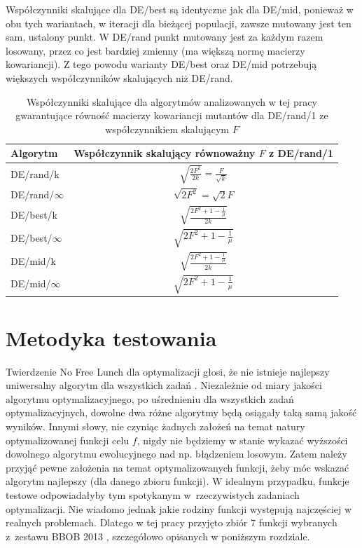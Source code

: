 \documentclass[a4paper,onecolumn,oneside,12pt,wide,floatssmall]{mwrep}
\theoremstyle{definition}
\theoremstyle{plain}%
\theoremstyle{remark}
\begin{document}
Współczynniki skalujące dla DE/best są identyczne jak dla DE/mid, ponieważ w obu tych wariantach,
w iteracji dla bieżącej populacji, zawsze mutowany jest ten sam, ustalony punkt. 
W DE/rand punkt mutowany jest za każdym razem losowany, 
przez co jest bardziej zmienny (ma większą normę macierzy kowariancji).
Z tego powodu warianty DE/best oraz DE/mid potrzebują większych współczynników skalujących niż DE/rand.

\begin{table}[H]
\centering
\begin{tabular}{ l | c }
Algorytm         & Współczynnik skalujący równoważny $F$ z DE/rand/1 \\ \hline
DE/rand/k        & $\sqrt{\frac{2F^2}{2k}} = \frac{F}{\sqrt{k}}$ \\ 
DE/rand/$\infty$ & $\sqrt{2F^2} = \sqrt{2}F$ \\ \hline
DE/best/k        & $\sqrt{\frac{2F^2 + 1 - \frac{1}{\mu}}{2k}}$ \\
DE/best/$\infty$ & $\sqrt{2F^2 + 1 - \frac{1}{\mu}}$ \\ \hline
DE/mid/k         & $\sqrt{\frac{2F^2 + 1 - \frac{1}{\mu}}{2k}}$ \\
DE/mid/$\infty$  & $\sqrt{2F^2 + 1 - \frac{1}{\mu}}$ \\
\end{tabular}
\caption{Współczynniki skalujące dla algorytmów analizowanych w tej pracy gwarantujące równość macierzy kowariancji mutantów
dla DE/rand/1 ze współczynnikiem skalującym $F$}
\label{table:wspolczynniki}
\end{table}

\chapter{Metodyka testowania}
\label{chap:metodyka}

Twierdzenie No Free Lunch dla optymalizacji głosi, że nie istnieje najlepszy uniwersalny algorytm dla wszystkich zadań \cite{lunch}. 
Niezależnie od miary jakości algorytmu optymalizacyjnego, po uśrednieniu dla wszystkich zadań optymalizacyjnych, 
dowolne dwa różne algorytmy będą osiągały taką samą jakość wyników. Innymi słowy,
nie czyniąc żadnych założeń na temat natury optymalizowanej funkcji celu $f$, 
nigdy nie będziemy w stanie wykazać wyższości dowolnego algorytmu ewolucyjnego nad np. błądzeniem losowym. 
Zatem należy przyjąć pewne założenia na temat optymalizowanych funkcji, żeby móc wskazać algorytm najlepszy (dla danego zbioru funkcji).
W idealnym przypadku, funkcje testowe odpowiadałyby tym spotykanym w~rzeczywistych zadaniach optymalizacji.
Nie wiadomo jednak jakie rodziny funkcji występują najczęściej w realnych problemach.
Dlatego w tej pracy przyjęto zbiór 7 funkcji wybranych z~zestawu BBOB 2013 \cite{noiseless}, szczegółowo opisanych w poniższym rozdziale.
\end{document}
